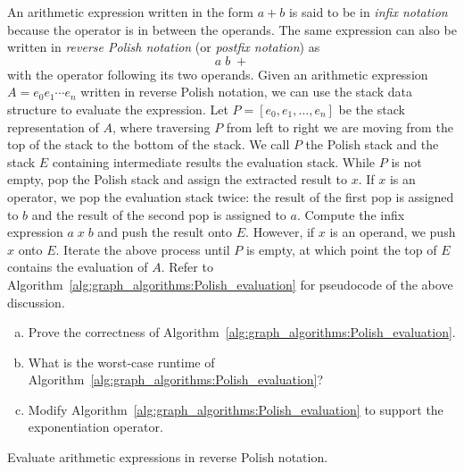\begin{problem}
\item An arithmetic expression written in the form $a + b$ is said to
  be in \emph{infix notation} because the
  operator is in between the operands. The same expression can also be
  written in
  \emph{reverse Polish notation} (or
  \emph{postfix notation}) as
  \[
  a\; b\; +
  \]
  with the operator following its two operands. Given an arithmetic
  expression $A = e_0 e_1 \cdots e_n$ written in reverse Polish
  notation, we can use the stack data structure to evaluate the
  expression. Let $P = [e_0, e_1, \dots, e_n]$ be the stack
  representation of $A$, where traversing $P$ from left to right we
  are moving from the top of the stack to the bottom of the stack. We
  call $P$ the Polish stack and the stack $E$ containing intermediate
  results the evaluation stack. While $P$ is not empty, pop the Polish
  stack and assign the extracted result to $x$. If $x$ is an operator,
  we pop the evaluation stack twice: the result of the first pop is
  assigned to $b$ and the result of the second pop is assigned to
  $a$. Compute the infix expression $a\; x\; b$ and push the result
  onto $E$. However, if $x$ is an operand, we push $x$ onto
  $E$. Iterate the above process until $P$ is empty, at which point
  the top of $E$ contains the evaluation of $A$. Refer to
  Algorithm~\ref{alg:graph_algorithms:Polish_evaluation} for
  pseudocode of the above discussion.
  \begin{enumerate}[(a)]
  \item Prove the correctness of
    Algorithm~\ref{alg:graph_algorithms:Polish_evaluation}.

  \item What is the worst-case runtime of
    Algorithm~\ref{alg:graph_algorithms:Polish_evaluation}?

  \item Modify Algorithm~\ref{alg:graph_algorithms:Polish_evaluation}
    to support the exponentiation operator.
  \end{enumerate}

\begin{algorithm}[!htbp]

\caption{Evaluate arithmetic expressions in reverse Polish notation.}
\label{alg:graph_algorithms:Polish_evaluation}
\end{algorithm}


\end{problem}
